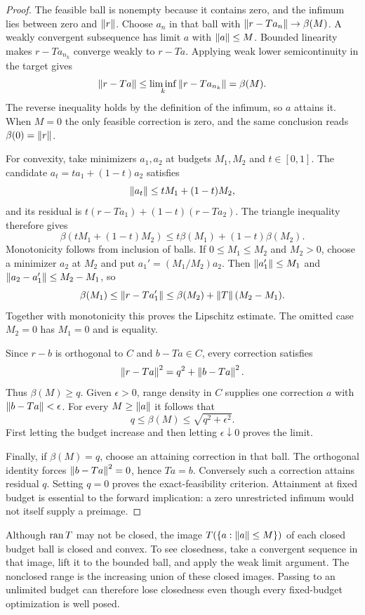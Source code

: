 \begin{proof}
The feasible ball is nonempty because it contains zero, and the infimum lies between zero and $\left\lVert r\right\rVert$. Choose $a_n$ in that ball with $\left\lVert r-Ta_n\right\rVert\to\beta(M)$. A weakly convergent subsequence has limit $a$ with $\left\lVert a\right\rVert\le M$. Bounded linearity makes $r-Ta_{n_k}$ converge weakly to $r-Ta$. Applying weak lower semicontinuity in the target gives
\[
 \left\lVert r-Ta\right\rVert\le\liminf_k\left\lVert r-Ta_{n_k}\right\rVert=\beta(M).
\]
The reverse inequality holds by the definition of the infimum, so $a$ attains it. When $M=0$ the only feasible correction is zero, and the same conclusion reads $\beta(0)=\left\lVert r\right\rVert$.

For convexity, take minimizers $a_1,a_2$ at budgets $M_1,M_2$ and $t\in[0,1]$. The candidate $a_t=ta_1+(1-t)a_2$ satisfies
\[
 \left\lVert a_t\right\rVert\le tM_1+(1-t)M_2,
\]
and its residual is $t(r-Ta_1)+(1-t)(r-Ta_2)$. The triangle inequality therefore gives
\[
 \beta(tM_1+(1-t)M_2)\le t\beta(M_1)+(1-t)\beta(M_2).
\]
Monotonicity follows from inclusion of balls. If $0\le M_1\le M_2$ and $M_2>0$, choose a minimizer $a_2$ at $M_2$ and put $a_1'=(M_1/M_2)a_2$. Then $\left\lVert a_1'\right\rVert\le M_1$ and $\left\lVert a_2-a_1'\right\rVert\le M_2-M_1$, so
\[
 \beta(M_1)\le\left\lVert r-Ta_1'\right\rVert
 \le\beta(M_2)+\left\lVert T\right\rVert(M_2-M_1).
\]
Together with monotonicity this proves the Lipschitz estimate. The omitted case $M_2=0$ has $M_1=0$ and is equality.

Since $r-b$ is orthogonal to $C$ and $b-Ta\in C$, every correction satisfies
\begin{equation}\label{eq:range-decomposition}
 \left\lVert r-Ta\right\rVert^2=q^2+\left\lVert b-Ta\right\rVert^2.
\end{equation}
Thus $\beta(M)\ge q$. Given $\epsilon>0$, range density in $C$ supplies one correction $a$ with $\left\lVert b-Ta\right\rVert<\epsilon$. For every $M\ge\left\lVert a\right\rVert$ it follows that
\[
 q\le\beta(M)\le\sqrt{q^2+\epsilon^2}.
\]
First letting the budget increase and then letting $\epsilon\downarrow0$ proves the limit.

Finally, if $\beta(M)=q$, choose an attaining correction in that ball. The orthogonal identity forces $\left\lVert b-Ta\right\rVert^2=0$, hence $Ta=b$. Conversely such a correction attains residual $q$. Setting $q=0$ proves the exact-feasibility criterion. Attainment at fixed budget is essential to the forward implication: a zero unrestricted infimum would not itself supply a preimage.
\end{proof}

Although $\operatorname{ran} T$ may not be closed, the image $T(\{a:\left\lVert a\right\rVert\le M\})$ of each closed budget ball is closed and convex. To see closedness, take a convergent sequence in that image, lift it to the bounded ball, and apply the weak limit argument. The nonclosed range is the increasing union of these closed images. Passing to an unlimited budget can therefore lose closedness even though every fixed-budget optimization is well posed.

